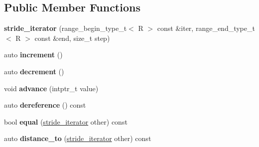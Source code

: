 \subsection*{Public Member Functions}
\begin{DoxyCompactItemize}
\item 
\mbox{\label{struct_r_a_h___n_a_m_e_s_p_a_c_e_1_1view_1_1stride__iterator_a4aeb915e3f46829e15c6dcbb7f7fae56}} 
{\bfseries stride\+\_\+iterator} (range\+\_\+begin\+\_\+type\+\_\+t$<$ R $>$ const \&iter, range\+\_\+end\+\_\+type\+\_\+t$<$ R $>$ const \&end, size\+\_\+t step)
\item 
\mbox{\label{struct_r_a_h___n_a_m_e_s_p_a_c_e_1_1view_1_1stride__iterator_ae576499e34e79e69abb098da95df0976}} 
auto {\bfseries increment} ()
\item 
\mbox{\label{struct_r_a_h___n_a_m_e_s_p_a_c_e_1_1view_1_1stride__iterator_ada1710cdcc7a83efb9333f69d3eb0d45}} 
auto {\bfseries decrement} ()
\item 
\mbox{\label{struct_r_a_h___n_a_m_e_s_p_a_c_e_1_1view_1_1stride__iterator_a73a6c28f8f18ea5a72abad3d3496201b}} 
void {\bfseries advance} (intptr\+\_\+t value)
\item 
\mbox{\label{struct_r_a_h___n_a_m_e_s_p_a_c_e_1_1view_1_1stride__iterator_a17abd01fbb81f71d6619aab81eafcdf0}} 
auto {\bfseries dereference} () const
\item 
\mbox{\label{struct_r_a_h___n_a_m_e_s_p_a_c_e_1_1view_1_1stride__iterator_aca913bf726fcb5ed4de3c7dd2bc8d800}} 
bool {\bfseries equal} (\mbox{\hyperlink{struct_r_a_h___n_a_m_e_s_p_a_c_e_1_1view_1_1stride__iterator}{stride\+\_\+iterator}} other) const
\item 
\mbox{\label{struct_r_a_h___n_a_m_e_s_p_a_c_e_1_1view_1_1stride__iterator_a42a626384940d5b0dca993927b79cb0b}} 
auto {\bfseries distance\+\_\+to} (\mbox{\hyperlink{struct_r_a_h___n_a_m_e_s_p_a_c_e_1_1view_1_1stride__iterator}{stride\+\_\+iterator}} other) const
\end{DoxyCompactItemize}
